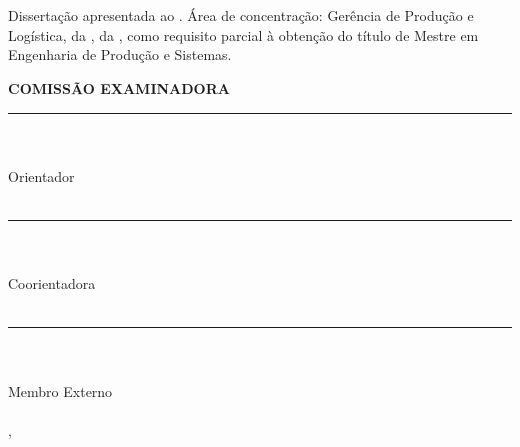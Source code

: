 \begin{center}
    {\MakeUppercase{\textbf{\aluno}} \\ [1cm]

    \MakeUppercase{\textbf{\titulo}} \\ [1cm]

    \hspace{.45\textwidth} %
        \begin{minipage}{.5\textwidth}
        \noindent Dissertação apresentada ao \curso. Área de concentração: Gerência de Produção e Logística, da \departamento, da \universidade, como requisito parcial à obtenção do título de Mestre em Engenharia de Produção e Sistemas. \\ [5mm]
        \end{minipage}
    \textbf{COMISSÃO EXAMINADORA} \\ [1cm]
    
    \rule{5cm}{.1mm} \\ \orientador \\ Orientador\\ \universidade \\ [5mm]

    \rule{5cm}{.1mm} \\ \coorientador \\ Coorientadora \\ \universidade \\ [5mm]

    \rule{5cm}{.1mm} \\ \convidadoa \\ Membro Externo \\ \univconvidadoa \\ [5mm]
    
    
  
    
    \cidade, \datadefesa
    }
\end{center}
